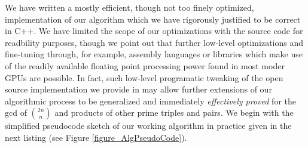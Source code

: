 \documentclass[12pt]{article}
\begin{document}
We have written a mostly efficient, though not too finely optimized, implementation of our 
algorithm which we have rigorously justified to be correct in C++. We have limited the scope of 
our optimizations with the source code for readbility purposes, though we point out that further 
low-level optimizations and fine-tuning through, for example, assembly languages or libraries which 
make use of the readily available floating point processing power found in most moder GPUs are possible. 
In fact, such low-level programatic tweaking of the open source implementation we provide in 
\cite{105-PROBLEM-GITHUBREPO} may allow further extensions of our algorithmic process to be 
generalized and immediately \emph{effectively proved} for the gcd of $\binom{2n}{n}$ and products of 
other prime triples and pairs. We begin with the simplified pseudocode sketch of our working 
algorithm in practice given in the next listing (see Figure \ref{figure_AlgPseudoCode}). 
\end{document}
